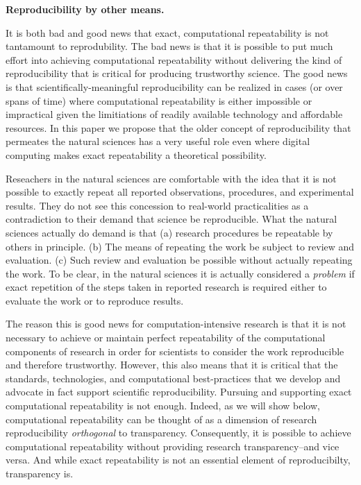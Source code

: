 \textbf{Reproducibility by other means.}

It is both bad and good news that exact, computational repeatability is not tantamount to reprodubility.
The bad news is that it is possible to put much effort into achieving computational repeatability without delivering
	the kind of reproducibility that is critical for producing trustworthy science.
The good news is that scientifically-meaningful reproducibility can be realized in cases (or over spans of time)
	where computational repeatability is either impossible or impractical given the limitiations of 
	readily available technology and affordable resources.
In this paper we propose that the older concept of reproducibility that permeates the natural sciences has a very
	useful role even where digital computing makes exact repeatability a theoretical possibility.

 Reseachers in the natural sciences are comfortable with the idea that it is not possible to exactly
	repeat all reported observations, procedures, and experimental results.
They do not see this concession to real-world practicalities as a contradiction to their demand that science be reproducible.
What the natural sciences actually do demand is that 
	(a) research procedures be repeatable by others in principle.
	(b) The means of repeating the work be subject to review and evaluation. 
	(c) Such review and evaluation be possible without actually repeating the work.
To be clear, in the natural sciences it is actually considered a \emph{problem} if exact repetition of the steps
	taken in reported research is required either to evaluate the work or to reproduce results.

The reason this is good news for computation-intensive research is that it is not necessary to achieve or 
	maintain perfect repeatability of the computational components of research in order for scientists to 
	consider the work reproducible and therefore trustworthy.
However, this also means that it is critical that the standards, technologies, and computational best-practices that
	we develop and advocate in fact support scientific reproducibility.
Pursuing and supporting exact computational repeatability is not enough.
Indeed, as we will show below, computational repeatability can be thought of as a dimension of research
	reproducibility \emph{orthogonal} to transparency.
Consequently, it is possible to achieve computational repeatability without providing research transparency--and vice versa.
And while exact repeatability is not an essential element of reproducibilty, transparency is.

